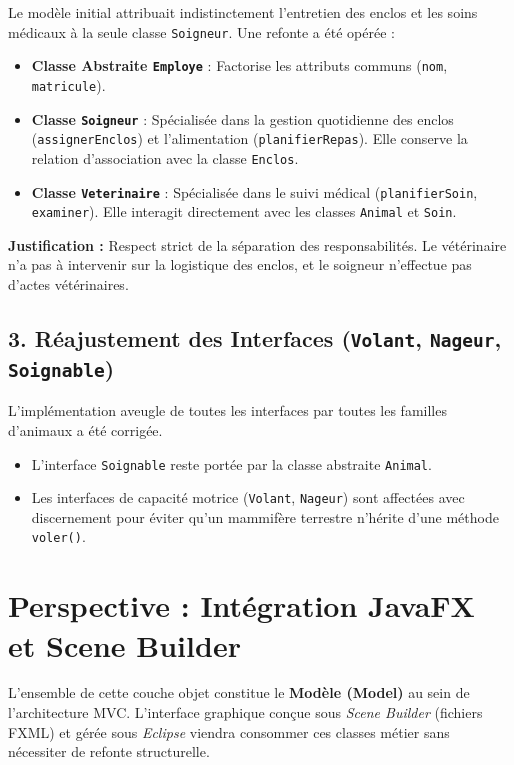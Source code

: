 \documentclass[12pt,a4paper]{article}
\begin{document}
Le modèle initial attribuait indistinctement l'entretien des enclos et les soins
médicaux à la seule classe \texttt{Soigneur}. Une refonte a été opérée :
\begin{itemize}
   \item \textbf{Classe Abstraite \texttt{Employe}} : Factorise les attributs
         communs (\texttt{nom}, \texttt{matricule}).
   \item \textbf{Classe \texttt{Soigneur}} : Spécialisée dans la gestion
         quotidienne des enclos (\texttt{assignerEnclos}) et l'alimentation
         (\texttt{planifierRepas}). Elle conserve la relation d'association avec
         la classe \texttt{Enclos}.
   \item \textbf{Classe \texttt{Veterinaire}} : Spécialisée dans le suivi
         médical (\texttt{planifierSoin}, \texttt{examiner}). Elle interagit
         directement avec les classes \texttt{Animal} et \texttt{Soin}.
\end{itemize}
\textbf{Justification :} Respect strict de la séparation des responsabilités. Le
vétérinaire n'a pas à intervenir sur la logistique des enclos, et le soigneur
n'effectue pas d'actes vétérinaires.

\subsection{
   3. Réajustement des Interfaces (\texttt{Volant}, \texttt{Nageur},
   \texttt{Soignable})
}

L'implémentation aveugle de toutes les interfaces par toutes les familles
d'animaux a été corrigée.
\begin{itemize}
   \item L'interface \texttt{Soignable} reste portée par la classe abstraite
         \texttt{Animal}.
   \item Les interfaces de capacité motrice (\texttt{Volant}, \texttt{Nageur})
         sont affectées avec discernement pour éviter qu'un mammifère terrestre
         n'hérite d'une méthode \texttt{voler()}.
\end{itemize}

\section{Perspective : Intégration JavaFX et Scene Builder}

L'ensemble de cette couche objet constitue le \textbf{Modèle (Model)} au sein de
l'architecture MVC. L'interface graphique conçue sous \textit{Scene Builder}
(fichiers FXML) et gérée sous \textit{Eclipse} viendra consommer ces classes
métier sans nécessiter de refonte structurelle.
\end{document}
